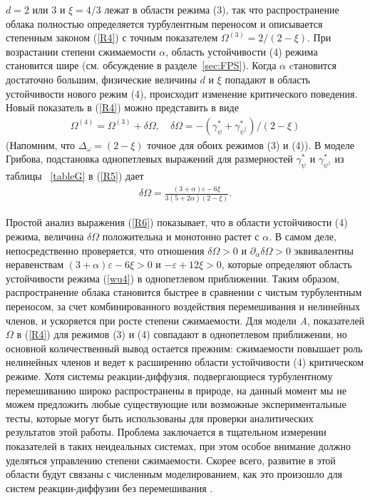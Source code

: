 \documentclass[a4paper,10pt]{article}
\begin{document}
 $d=2$ или 3  и $\xi=4/3$ лежат в области режима (3), так что
 распространение облака полностью определяется турбулентным переносом и описывается степенным законом (\ref{R4}) с точным показателем  $\Omega^{(3)}= 2/(2-\xi)$.
При возрастании степени сжимаемости $\alpha$, область устойчивости (4) режима становится шире (см. обсуждение в разделе~\ref{sec:FPS}).
Когда $\alpha$ cтановится достаточно большим, физические величины  $d$ и $\xi$  попадают в область устойчивости нового режим (4), происходит изменение критического поведения.
Новый показатель в (\ref{R4}) можно представить в виде
\begin{eqnarray}
\Omega^{(4)}= \Omega^{(3)} + \delta\Omega, \quad
\delta\Omega = - (\gamma_{\psi}^{*}+\gamma_{\psi^{\dag}}^{*}) / (2-\xi)
\label{R5}
\end{eqnarray}
(Напомним, что  $\Delta_{\omega}=(2-\xi)$ точное для обоих режимов (3) и (4)).
В моделе Грибова, подстановка однопетлевых выражений для размерностей $\gamma_{\psi}^{*}$ и $\gamma_{\psi^{\dag}}^{*}$ из таблицы ~\ref{tableG} в (\ref{R5}) дает
\begin{eqnarray}
\delta\Omega = \frac{(3+\alpha)\varepsilon-6\xi}{3(5+2\alpha)(2-\xi)}.
\label{R6}
\end{eqnarray}

Простой анализ выражения (\ref{R6}) показывает, что в области устойчивости (4) режима, величина $\delta\Omega$ положительна и монотонно растет с $\alpha$.
В самом деле, непосредственно проверяется, что отношения $\delta\Omega>0$
и $\partial_{\alpha}\delta\Omega>0$ эквивалентны неравенствам $(3+\alpha)\varepsilon-6\xi>0$ и $-\varepsilon+12\xi>0$,
которые определяют область устойчивости режима (\ref{wu4}) в однопетлевом приближении.
Таким образом, распространение облака становится быстрее в сравнении с чистым турбулентным переносом,
за счет комбинированного воздействия перемешивания и нелинейных членов, и ускоряется при росте степени сжимаемости.
Для модели {\it A}, показателей $\Omega$ в (\ref{R4}) для режимов (3) и (4) совпадают в однопетлевом приближении, но основной количественный вывод остается прежним: 
сжимаемости повышает роль нелинейных членов и ведет к расширению области устойчивости (4) критическом режиме.
Хотя системы реакции-диффузия, подвергающиеся турбулентному перемешиванию широко распространены в природе, на данный момент мы не можем предложить любые существующие или
возможные экспериментальные тесты, которые могут быть использованы для проверки аналитических результатов этой работы.
Проблема заключается в тщательном измерении показателей в таких неидеальных системах, при этом особое внимание должно уделяться управлению степени сжимаемости.
Скорее всего, развитие в этой области будут связаны с численным моделированием, как это произошло для систем реакции-диффузии без перемешивания \cite{Hinr}.
\newpage
\end{document}
